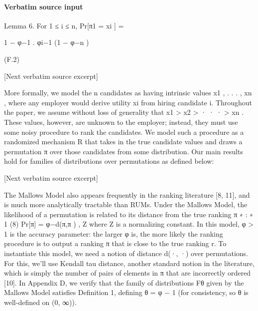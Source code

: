 \documentclass[10pt]{article}
\begin{document}
\paragraph{Verbatim source input}
\begin{ReviewVerbatim}
Lemma 6. For 1 ≤ i ≤ n,
Pr[π1 = xi ] =

1 − φ−1
.
φi−1 (1 − φ−n )

(F.2)

[Next verbatim source excerpt]

More formally, we model the n candidates as having intrinsic values x1 , . . . , xn , where any employer would
derive utility xi from hiring candidate i. Throughout the paper, we assume without loss of generality that
x1 > x2 > · · · > xn . These values, however, are unknown to the employer; instead, they must use some
noisy procedure to rank the candidates. We model such a procedure as a randomized mechanism R that
takes in the true candidate values and draws a permutation π over those candidates from some distribution.
Our main results hold for families of distributions over permutations as defined below:

[Next verbatim source excerpt]

The Mallows Model also appears frequently in the ranking literature [8, 11], and is much more analytically
tractable than RUMs. Under the Mallows Model, the likelihood of a permutation is related to its distance
from the true ranking π ∗ :
∗
1
(8)
Pr[π] = φ−d(π,π ) ,
Z
where Z is a normalizing constant. In this model, φ > 1 is the accuracy parameter: the larger φ is, the
more likely the ranking procedure is to output a ranking π that is close to the true ranking r. To instantiate
this model, we need a notion of distance d(·, ·) over permutations. For this, we’ll use Kendall tau distance,
another standard notion in the literature, which is simply the number of pairs of elements in π that are
incorrectly ordered [10]. In Appendix D, we verify that the family of distributions Fθ given by the Mallows
Model satisfies Definition 1, defining θ = φ − 1 (for consistency, so θ is well-defined on (0, ∞)).
\end{ReviewVerbatim}
\end{document}
